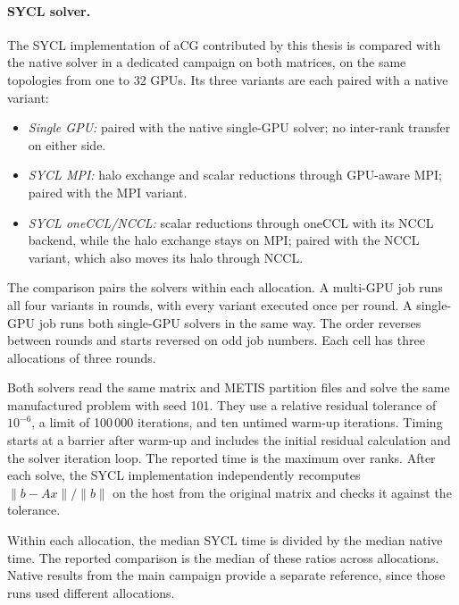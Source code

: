 \paragraph{SYCL solver.} The SYCL implementation of aCG contributed by this thesis \cite{merenda_acg_sycl_2026} is compared with the native solver in a dedicated campaign on both matrices, on the same topologies from one to 32 GPUs. Its three variants are each paired with a native variant:
\begin{itemize}
    \item \emph{Single GPU:} paired with the native single-GPU solver; no inter-rank transfer on either side.
    \item \emph{SYCL MPI:} halo exchange and scalar reductions through GPU-aware MPI; paired with the MPI variant.
    \item \emph{SYCL oneCCL/NCCL:} scalar reductions through oneCCL with its NCCL backend, while the halo exchange stays on MPI; paired with the NCCL variant, which also moves its halo through NCCL.
\end{itemize}
The comparison pairs the solvers within each allocation. A multi-GPU job runs all four variants in rounds, with every variant executed once per round. A single-GPU job runs both single-GPU solvers in the same way. The order reverses between rounds and starts reversed on odd job numbers. Each cell has three allocations of three rounds.

Both solvers read the same matrix and METIS partition files and solve the same manufactured problem with seed 101. They use a relative residual tolerance of $10^{-6}$, a limit of 100\,000 iterations, and ten untimed warm-up iterations. Timing starts at a barrier after warm-up and includes the initial residual calculation and the solver iteration loop. The reported time is the maximum over ranks. After each solve, the SYCL implementation independently recomputes $\|b - Ax\| / \|b\|$ on the host from the original matrix and checks it against the tolerance.

Within each allocation, the median SYCL time is divided by the median native time. The reported comparison is the median of these ratios across allocations. Native results from the main campaign provide a separate reference, since those runs used different allocations.

